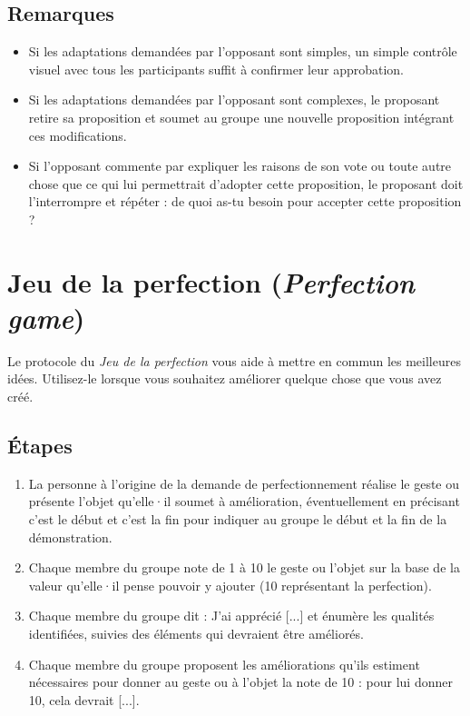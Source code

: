 \documentclass[11pt]{book}
\let\oldsection\section
\renewcommand\section{\clearpage\oldsection}
\begin{document}
\subsection{Remarques}
\begin{itemize}
	\item Si les adaptations demandées par l'opposant sont simples, un simple contrôle visuel avec tous les participants suffit à confirmer leur approbation.
	\item Si les adaptations demandées par l'opposant sont complexes, le proposant retire sa proposition et soumet au groupe une nouvelle proposition intégrant
	      ces modifications.
	\item Si l'opposant commente par expliquer les raisons de son vote ou toute autre chose que ce qui lui permettrait d'adopter cette proposition, le proposant
	      doit l'interrompre et répéter : \og{}de quoi as-tu besoin pour accepter cette proposition ?\fg{}
\end{itemize}

\section{Jeu de la perfection (\emph{Perfection game})}

Le protocole du \emph{Jeu de la perfection} vous aide à mettre en commun les meilleures idées. Utilisez-le lorsque vous souhaitez améliorer quelque chose que vous
avez créé.

\subsection{Étapes}
\begin{enumerate}
	\item La personne à l'origine de la demande de perfectionnement réalise le geste ou présente l'objet qu'elle·il soumet à amélioration, éventuellement en
	      précisant \og{}c'est le début\fg{} et \og{}c'est la fin\fg{} pour indiquer au groupe le début et la fin de la démonstration.
	\item Chaque membre du groupe note de 1 à 10 le geste ou l'objet sur la base de la valeur qu'elle·il pense pouvoir y ajouter (10 représentant la perfection).
	\item Chaque membre du groupe dit : \og{}J'ai apprécié [...]\fg{} et énumère les qualités identifiées, suivies des éléments qui devraient être améliorés.
	\item Chaque membre du groupe proposent les améliorations qu'ils estiment nécessaires pour donner au geste ou à l'objet la note de 10 : \og{}pour lui donner
	      10, cela devrait [...]\fg{}.
\end{enumerate}
\end{document}
